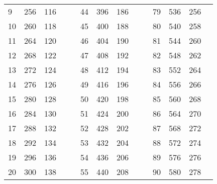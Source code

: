 \begin{table}[!h]
\begin{tabular}{|l|l|l|ll|l|l|l|llllll}
		9 & 256 & 116 &  &  & 44 & 396 & 186 &  & \multicolumn{1}{l|}{} & \multicolumn{1}{l|}{79} & \multicolumn{1}{l|}{536} & \multicolumn{1}{l|}{256} &  \\ \cline{1-3} \cline{6-8} \cline{11-13}
		10 & 260 & 118 &  &  & 45 & 400 & 188 &  & \multicolumn{1}{l|}{} & \multicolumn{1}{l|}{80} & \multicolumn{1}{l|}{540} & \multicolumn{1}{l|}{258} &  \\ \cline{1-3} \cline{6-8} \cline{11-13}
		11 & 264 & 120 &  &  & 46 & 404 & 190 &  & \multicolumn{1}{l|}{} & \multicolumn{1}{l|}{81} & \multicolumn{1}{l|}{544} & \multicolumn{1}{l|}{260} &  \\ \cline{1-3} \cline{6-8} \cline{11-13}
		12 & 268 & 122 &  &  & 47 & 408 & 192 &  & \multicolumn{1}{l|}{} & \multicolumn{1}{l|}{82} & \multicolumn{1}{l|}{548} & \multicolumn{1}{l|}{262} &  \\ \cline{1-3} \cline{6-8} \cline{11-13}
		13 & 272 & 124 &  &  & 48 & 412 & 194 &  & \multicolumn{1}{l|}{} & \multicolumn{1}{l|}{83} & \multicolumn{1}{l|}{552} & \multicolumn{1}{l|}{264} &  \\ \cline{1-3} \cline{6-8} \cline{11-13}
		14 & 276 & 126 &  &  & 49 & 416 & 196 &  & \multicolumn{1}{l|}{} & \multicolumn{1}{l|}{84} & \multicolumn{1}{l|}{556} & \multicolumn{1}{l|}{266} &  \\ \cline{1-3} \cline{6-8} \cline{11-13}
		15 & 280 & 128 &  &  & 50 & 420 & 198 &  & \multicolumn{1}{l|}{} & \multicolumn{1}{l|}{85} & \multicolumn{1}{l|}{560} & \multicolumn{1}{l|}{268} &  \\ \cline{1-3} \cline{6-8} \cline{11-13}
		16 & 284 & 130 &  &  & 51 & 424 & 200 &  & \multicolumn{1}{l|}{} & \multicolumn{1}{l|}{86} & \multicolumn{1}{l|}{564} & \multicolumn{1}{l|}{270} &  \\ \cline{1-3} \cline{6-8} \cline{11-13}
		17 & 288 & 132 &  &  & 52 & 428 & 202 &  & \multicolumn{1}{l|}{} & \multicolumn{1}{l|}{87} & \multicolumn{1}{l|}{568} & \multicolumn{1}{l|}{272} &  \\ \cline{1-3} \cline{6-8} \cline{11-13}
		18 & 292 & 134 &  &  & 53 & 432 & 204 &  & \multicolumn{1}{l|}{} & \multicolumn{1}{l|}{88} & \multicolumn{1}{l|}{572} & \multicolumn{1}{l|}{274} &  \\ \cline{1-3} \cline{6-8} \cline{11-13}
		19 & 296 & 136 &  &  & 54 & 436 & 206 &  & \multicolumn{1}{l|}{} & \multicolumn{1}{l|}{89} & \multicolumn{1}{l|}{576} & \multicolumn{1}{l|}{276} &  \\ \cline{1-3} \cline{6-8} \cline{11-13}
		20 & 300 & 138 &  &  & 55 & 440 & 208 &  & \multicolumn{1}{l|}{} & \multicolumn{1}{l|}{90} & \multicolumn{1}{l|}{580} & \multicolumn{1}{l|}{278} &  \\ \cline{1-3} \cline{6-8} \cline{11-13}

\end{tabular}
\end{table}
